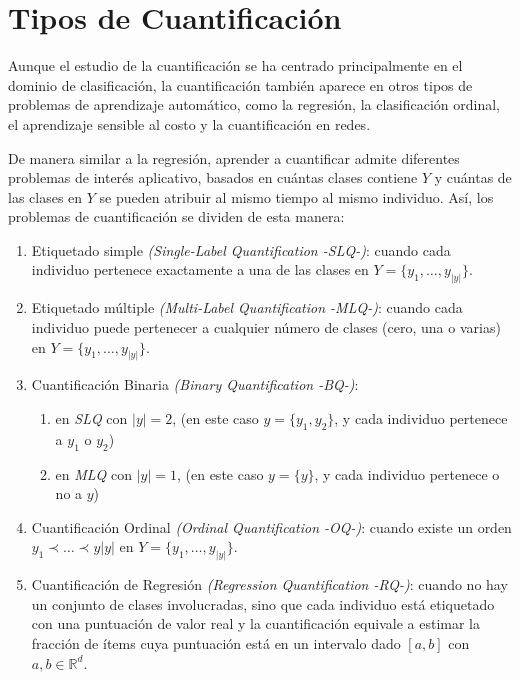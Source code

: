 \section{Tipos de Cuantificación}\label{problema:tipos}

Aunque el estudio de la cuantificación se ha centrado principalmente en el
dominio de clasificación, la cuantificación también aparece en otros tipos de
problemas de aprendizaje automático, como la regresión, la clasificación
ordinal, el aprendizaje sensible al costo y la cuantificación en redes.

De manera similar a la regresión, aprender a cuantificar admite diferentes
problemas de interés aplicativo, basados en cuántas clases contiene $Y$ y
cuántas de las clases en $Y$ se pueden atribuir al mismo tiempo al mismo
individuo. Así, los problemas de cuantificación se dividen de esta manera:

\begin{enumerate}
    \item Etiquetado simple {\it (Single-Label Quantification -SLQ-)\/}: cuando
    cada individuo pertenece exactamente a una de las clases en
    $Y=\{y_1,\dots,y_{|y|}\}$.
    \item Etiquetado múltiple {\it (Multi-Label Quantification -MLQ-)\/}: cuando
    cada individuo puede pertenecer a cualquier número de clases (cero, una o
    varias) en $Y=\{y_1,\dots,y_{|y|}\}$.
    \item Cuantificación Binaria {\it (Binary Quantification -BQ-)\/}:
    \begin{enumerate}
        \item en {\it SLQ\/} con $|y|=2$, (en este caso $y=\{y_1,y_2\}$, y cada
        individuo pertenece a $y_1$ o $y_2$)
        \item en {\it MLQ\/} con $|y|=1$, (en este caso $y=\{y\}$, y cada
        individuo pertenece o no a $y$)
    \end{enumerate}
    \item Cuantificación Ordinal {\it (Ordinal Quantification -OQ-)\/}: cuando
    existe un orden $y_1 \prec \dots \prec y|y|$ en $Y=\{y_1,\dots,y_{|y|}\}$.
    \item Cuantificación de Regresión {\it (Regression Quantification -RQ-)\/}:
    cuando no hay un conjunto de clases involucradas, sino que cada individuo
    está etiquetado con una puntuación de valor real y la cuantificación
    equivale a estimar la fracción de ítems cuya puntuación está en un intervalo
    dado $[a, b]$ con ${a, b \in \mathbb{R}^d}$.
\end{enumerate}

